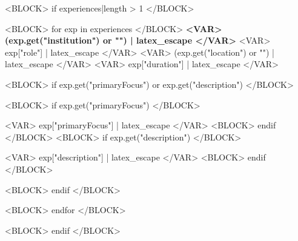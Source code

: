 <BLOCK> if experiences|length > 1 </BLOCK>



\begin{cventries}
<BLOCK> for exp in experiences </BLOCK>
  \cventry
    {\bodyfont\bfseries <VAR> (exp.get("institution") or "") | latex_escape </VAR>} %
    {<VAR> exp["role"] | latex_escape </VAR>} %
    {<VAR> (exp.get("location") or "") | latex_escape </VAR>} %
    {<VAR> exp["duration"] | latex_escape </VAR>} %
    {
      <BLOCK> if exp.get("primaryFocus") or exp.get("description") </BLOCK>
      \begin{cvitems} %
        <BLOCK> if exp.get("primaryFocus") </BLOCK>
        \item {<VAR> exp["primaryFocus"] | latex_escape </VAR>}
        <BLOCK> endif </BLOCK>
        <BLOCK> if exp.get("description") </BLOCK>
        \item {<VAR> exp["description"] | latex_escape </VAR>}
        <BLOCK> endif </BLOCK>
      \end{cvitems}
      <BLOCK> endif </BLOCK>
    }
<BLOCK> endfor </BLOCK>
\end{cventries}
<BLOCK> endif </BLOCK>
